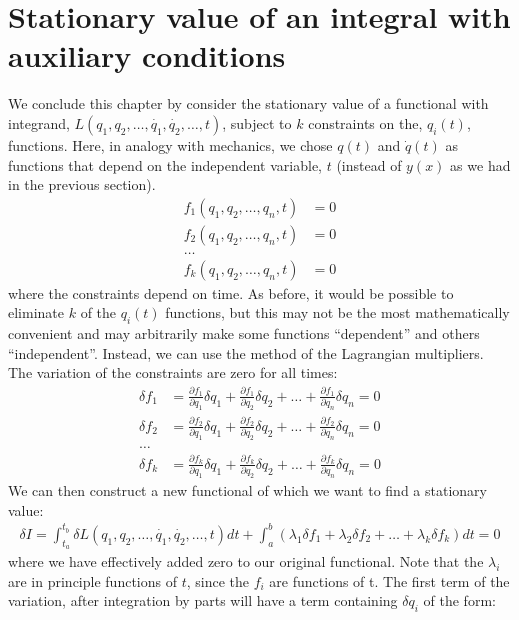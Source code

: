 \section{Stationary value of an integral with auxiliary conditions}
We conclude this chapter by consider the stationary value of a functional with integrand, $L(q_1,q_2,\dots,\dot{q_1}, \dot{q_2},\dots,t)$, subject to $k$ constraints on the, $q_i(t)$, functions. Here, in analogy with mechanics, we chose $q(t)$ and $\dot q(t)$ as functions that depend on the independent variable, $t$ (instead of $y(x)$ as we had in the previous section).
\begin{align}
f_1(q_1, q_2, \dots, q_n, t)&=0\nonumber\\
f_2(q_1, q_2, \dots, q_n, t)&=0\nonumber\\
\dots\nonumber\\
f_k(q_1, q_2, \dots, q_n, t)&=0
\end{align}
where the constraints depend on time. As before, it would be possible to eliminate $k$ of the $q_i(t)$ functions, but this may not be the most mathematically convenient and may arbitrarily make some functions ``dependent'' and others ``independent''. Instead, we can use the method of the Lagrangian multipliers. The variation of the constraints are zero for all times:
\begin{align}
\delta f_1&=\frac{\partial f_1}{\partial q_1}\delta q_1 + \frac{\partial f_1}{\partial q_2}\delta q_2 +\dots+\frac{\partial f_1}{\partial q_n}\delta q_n=0\nonumber\\
\delta f_2&=\frac{\partial f_2}{\partial q_1}\delta q_1 + \frac{\partial f_2}{\partial q_2}\delta q_2 +\dots+\frac{\partial f_2}{\partial q_n}\delta q_n=0\nonumber\\
\dots\nonumber\\
\delta f_k&=\frac{\partial f_k}{\partial q_1}\delta q_1 + \frac{\partial f_k}{\partial q_2}\delta q_2 +\dots+\frac{\partial f_k}{\partial q_n}\delta q_n=0
\label{eqn:varconstraints}
\end{align}
We can then construct a new functional of which we want to find a stationary value:
\begin{align}
\delta I = \int_{t_a}^{t_b}  \delta L(q_1,q_2,\dots,\dot{q_1}, \dot{q_2},\dots,t)dt+\int_a^b (\lambda_1 \delta f_1+\lambda_2 \delta f_2 +\dots +\lambda_k \delta f_k)dt=0
\end{align}
where we have effectively added zero to our original functional. Note that the $\lambda_i$ are in principle functions of $t$, since the $f_i$ are functions of t. The first term of the variation, after integration by parts will have a term containing $\delta q_i$ of the form:
